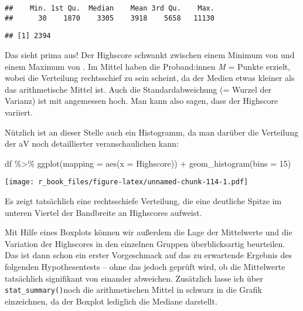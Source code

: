 \documentclass[
]{book}
\newenvironment{Shaded}{\begin{snugshade}}{\end{snugshade}}
\newcommand{\AttributeTok}[1]{\textcolor[rgb]{0.77,0.63,0.00}{#1}}
\newcommand{\DecValTok}[1]{\textcolor[rgb]{0.00,0.00,0.81}{#1}}
\newcommand{\FunctionTok}[1]{\textcolor[rgb]{0.00,0.00,0.00}{#1}}
\newcommand{\NormalTok}[1]{#1}
\newcommand{\SpecialCharTok}[1]{\textcolor[rgb]{0.00,0.00,0.00}{#1}}
\begin{document}
\begin{verbatim}
##    Min. 1st Qu.  Median    Mean 3rd Qu.    Max. 
##      30    1870    3305    3918    5658   11130
\end{verbatim}

\begin{Shaded}
\end{Shaded}

\begin{verbatim}
## [1] 2394
\end{verbatim}

Das sieht prima aus! Der Highscore schwankt zwischen einem Minimum von  und einem Maximum von . Im Mittel haben die Proband:innen \emph{M} =  Punkte erzielt, wobei die Verteilung rechtsschief zu sein scheint, da der Medien etwas kleiner als das arithmetische Mittel ist. Auch die Standardabweichung (= Wurzel der Varianz) ist mit  angemessen hoch. Man kann also sagen, dass der Highscore variiert.

Nützlich ist an dieser Stelle auch ein Histogramm, da man darüber die Verteilung der aV noch detaillierter veranschaulichen kann:

\begin{Shaded}
\begin{Highlighting}[]
\NormalTok{df }\SpecialCharTok{\%\textgreater{}\%} 
  \FunctionTok{ggplot}\NormalTok{(}\AttributeTok{mapping =} \FunctionTok{aes}\NormalTok{(}\AttributeTok{x =}\NormalTok{ Highscore)) }\SpecialCharTok{+}
  \FunctionTok{geom\_histogram}\NormalTok{(}\AttributeTok{bins =} \DecValTok{15}\NormalTok{)}
\end{Highlighting}
\end{Shaded}

\texttt{[image: r\_book\_files/figure-latex/unnamed-chunk-114-1.pdf]}

Es zeigt tatsächlich eine rechtsschiefe Verteilung, die eine deutliche Spitze im unteren Viertel der Bandbreite an Highscores aufweist.

Mit Hilfe eines Boxplots können wir außerdem die Lage der Mittelwerte und die Variation der Highscores in den einzelnen Gruppen überblicksartig beurteilen. Das ist dann schon ein erster Vorgeschmack auf das zu erwartende Ergebnis des folgenden Hypothesentests -- ohne das jedoch geprüft wird, ob die Mittelwerte tatsächlich signifikant von einander abweichen. Zusätzlich lasse ich über \texttt{stat\_summary()}noch die arithmetischen Mittel in schwarz in die Grafik einzeichnen, da der Boxplot lediglich die Mediane darstellt.
\end{document}
